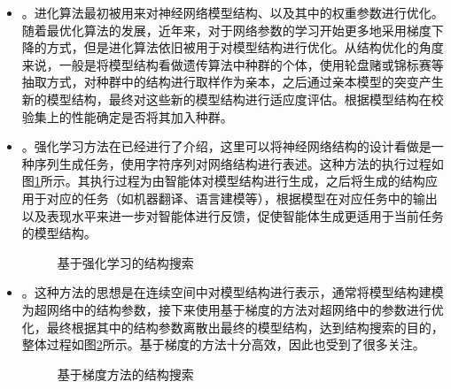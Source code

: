 \begin{itemize}
\vspace{0.5em}
\item {\small{}}。进化算法最初被用来对神经网络模型结构、以及其中的权重参数进行优化。随着最优化算法的发展，近年来，对于网络参数的学习开始更多地采用梯度下降的方式，但是进化算法依旧被用于对模型结构进行优化。从结构优化的角度来说，一般是将模型结构看做遗传算法中种群的个体，使用轮盘赌或锦标赛等抽取方式，对种群中的结构进行取样作为亲本，之后通过亲本模型的突变产生新的模型结构，最终对这些新的模型结构进行适应度评估。根据模型结构在校验集上的性能确定是否将其加入种群。
\vspace{0.5em}
\item 	{\small{}}。强化学习方法在{\chapterthirteen}已经进行了介绍，这里可以将神经网络结构的设计看做是一种序列生成任务，使用字符序列对网络结构进行表述。这种方法的执行过程如图\ref{fig:15-33}所示。其执行过程为由智能体对模型结构进行生成，之后将生成的结构应用于对应的任务（如机器翻译、语言建模等），根据模型在对应任务中的输出以及表现水平来进一步对智能体进行反馈，促使智能体生成更适用于当前任务的模型结构。

\begin{figure}[htp]
\centering

\caption{基于强化学习的结构搜索}
\label{fig:15-33}
\end{figure}

\vspace{0.5em}
\item 	{\small{}}。这种方法的思想是在连续空间中对模型结构进行表示，通常将模型结构建模为超网络中的结构参数，接下来使用基于梯度的方法对超网络中的参数进行优化，最终根据其中的结构参数离散出最终的模型结构，达到结构搜索的目的，整体过程如图\ref{fig:15-34}所示。基于梯度的方法十分高效，因此也受到了很多关注。
\vspace{0.5em}

\begin{figure}[htp]
\centering

\caption{基于梯度方法的结构搜索}
\label{fig:15-34}
\end{figure}

\end{itemize}

